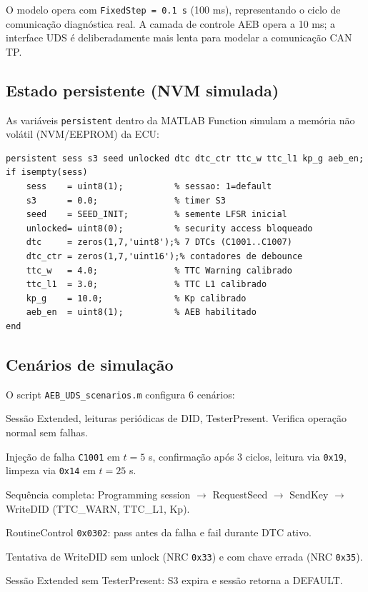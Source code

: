 \documentclass[12pt,a4paper]{article}
\newcommand{\sid}[1]{\texttt{0x#1}}
\newcommand{\dtc}[1]{\texttt{C#1}}
\begin{document}
O modelo opera com \texttt{FixedStep = 0.1 s} (100 ms), representando o
ciclo de comunicação diagnóstica real. A camada de controle AEB opera a
10 ms; a interface UDS é deliberadamente mais lenta para modelar a
comunicação CAN TP.

\subsection{Estado persistente (NVM simulada)}

As variáveis \texttt{persistent} dentro da MATLAB Function simulam a
memória não volátil (NVM/EEPROM) da ECU:

\begin{lstlisting}[style=mstyle, caption={Estado persistente do módulo UDS.}]
persistent sess s3 seed unlocked dtc dtc_ctr ttc_w ttc_l1 kp_g aeb_en;
if isempty(sess)
    sess    = uint8(1);          % sessao: 1=default
    s3      = 0.0;               % timer S3
    seed    = SEED_INIT;         % semente LFSR inicial
    unlocked= uint8(0);          % security access bloqueado
    dtc     = zeros(1,7,'uint8');% 7 DTCs (C1001..C1007)
    dtc_ctr = zeros(1,7,'uint16');% contadores de debounce
    ttc_w   = 4.0;               % TTC Warning calibrado
    ttc_l1  = 3.0;               % TTC L1 calibrado
    kp_g    = 10.0;              % Kp calibrado
    aeb_en  = uint8(1);          % AEB habilitado
end
\end{lstlisting}

\subsection{Cenários de simulação}

O script \texttt{AEB\_UDS\_scenarios.m} configura 6 cenários:

\begin{description}[style=nextline]
    \item[\texttt{'nominal'}]
        Sessão Extended, leituras periódicas de DID, TesterPresent.
        Verifica operação normal sem falhas.
    \item[\texttt{'dtc\_lifecycle'}]
        Injeção de falha \dtc{1001} em $t{=}5$ s, confirmação após 3 ciclos,
        leitura via \sid{19}, limpeza via \sid{14} em $t{=}25$ s.
    \item[\texttt{'calibration'}]
        Sequência completa: Programming session $\to$ RequestSeed $\to$
        SendKey $\to$ WriteDID (TTC\_WARN, TTC\_L1, Kp).
    \item[\texttt{'selftest'}]
        RoutineControl \texttt{0x0302}: pass antes da falha e fail durante
        DTC ativo.
    \item[\texttt{'sec\_denied'}]
        Tentativa de WriteDID sem unlock (NRC \texttt{0x33}) e com chave
        errada (NRC \texttt{0x35}).
    \item[\texttt{'session\_timeout'}]
        Sessão Extended sem TesterPresent: S3 expira e sessão retorna a
        DEFAULT.
\end{description}
\end{document}
